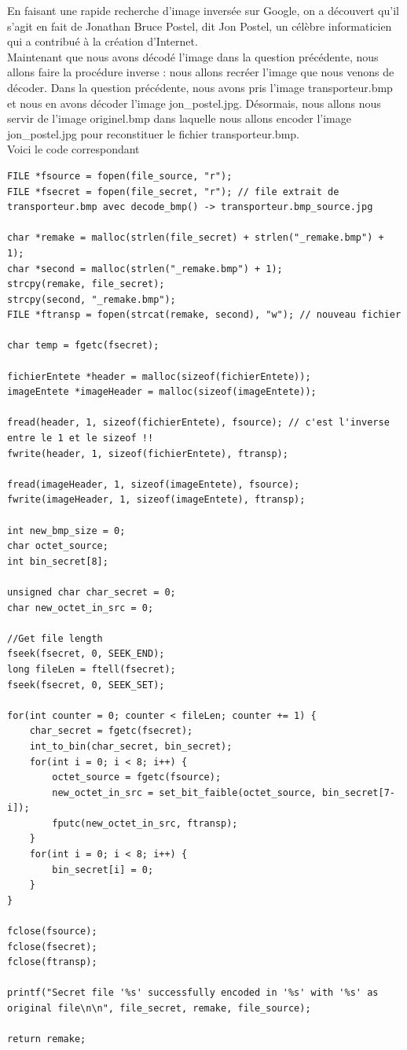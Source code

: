 \documentclass[12pt]{article}
\begin{document}
\newline
En faisant une rapide recherche d'image inversée sur Google, on a découvert qu'il s'agit en fait de Jonathan Bruce Postel, dit Jon Postel, un célèbre informaticien qui a contribué à la création d'Internet. \\
Maintenant que nous avons décodé l'image dans la question précédente, nous allons faire la procédure inverse : nous allons recréer l'image que nous venons de décoder. Dans la question précédente, nous avons pris l'image transporteur.bmp et nous en avons décoder l'image jon\_postel.jpg. Désormais, nous allons nous servir de l'image originel.bmp dans laquelle nous allons encoder l'image jon\_postel.jpg pour reconstituer le fichier transporteur.bmp. \\
Voici le code correspondant
\begin{lstlisting}[style=languageClarge, caption=Encodage d'un jpg secret dans une image bmp]
FILE *fsource = fopen(file_source, "r");
FILE *fsecret = fopen(file_secret, "r"); // file extrait de transporteur.bmp avec decode_bmp() -> transporteur.bmp_source.jpg

char *remake = malloc(strlen(file_secret) + strlen("_remake.bmp") + 1);
char *second = malloc(strlen("_remake.bmp") + 1);
strcpy(remake, file_secret);
strcpy(second, "_remake.bmp");
FILE *ftransp = fopen(strcat(remake, second), "w"); // nouveau fichier

char temp = fgetc(fsecret); 

fichierEntete *header = malloc(sizeof(fichierEntete));
imageEntete *imageHeader = malloc(sizeof(imageEntete));

fread(header, 1, sizeof(fichierEntete), fsource); // c'est l'inverse entre le 1 et le sizeof !!
fwrite(header, 1, sizeof(fichierEntete), ftransp);

fread(imageHeader, 1, sizeof(imageEntete), fsource);
fwrite(imageHeader, 1, sizeof(imageEntete), ftransp);

int new_bmp_size = 0;
char octet_source;
int bin_secret[8];

unsigned char char_secret = 0;
char new_octet_in_src = 0;

//Get file length
fseek(fsecret, 0, SEEK_END);
long fileLen = ftell(fsecret);
fseek(fsecret, 0, SEEK_SET);

for(int counter = 0; counter < fileLen; counter += 1) {
    char_secret = fgetc(fsecret);
    int_to_bin(char_secret, bin_secret);
    for(int i = 0; i < 8; i++) {
        octet_source = fgetc(fsource);
        new_octet_in_src = set_bit_faible(octet_source, bin_secret[7-i]);
        fputc(new_octet_in_src, ftransp);
    }
    for(int i = 0; i < 8; i++) {
        bin_secret[i] = 0;
    }
}

fclose(fsource);
fclose(fsecret);
fclose(ftransp);

printf("Secret file '%s' successfully encoded in '%s' with '%s' as original file\n\n", file_secret, remake, file_source);

return remake;
\end{lstlisting}
\end{document}
